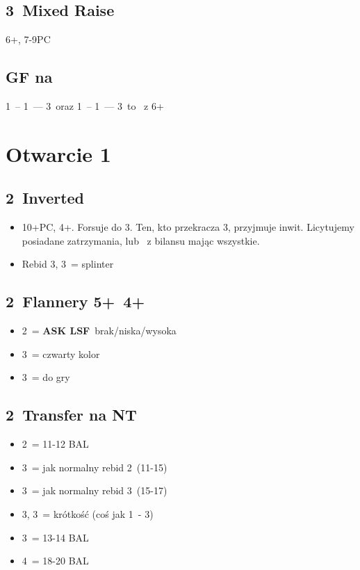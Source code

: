 \documentclass[12pt, a4paper]{article}
\newcommand{\lsf}{\color{WildStrawberry}\textbf{ASK LSF}\color{black}}
\begin{document}
\subsection*{3\clubs\ Mixed Raise}
6+\clubs, 7-9PC

\subsection*{GF na \clubs}
1\clubs\ -- 1\hearts\ --- 3\diams\ oraz 1\clubs\ -- 1\spades\ --- 3\hearts\ to \gf\ z 6+\clubs


\pagebreak
\section{Otwarcie 1\diams}
\subsection{2\diams\ Inverted}
\begin{itemize}
    \item 10+PC, 4+\diams. Forsuje do 3\diams. Ten, kto przekracza 3\diams, przyjmuje inwit.
    Licytujemy posiadane zatrzymania, lub \nt\ z bilansu mając wszystkie.
    \item Rebid 3\hearts, 3\spades\ = splinter
\end{itemize}

\subsection*{2\hearts\ Flannery 5+\spades\ 4+\hearts}
\begin{itemize}
    \item 2\nt\ = \lsf\ brak/niska/wysoka
    \item 3\clubs\ = czwarty kolor \gf
    \item 3\diams\ = do gry
\end{itemize}

\subsection*{2\spades\ Transfer na NT}
\begin{itemize}
    \item 2\nt\ = 11-12 BAL
    \item 3\clubs\ = jak normalny rebid 2\diams\ (11-15)
    \item 3\diams\ = jak normalny rebid 3\diams\ (15-17)
    \item 3\hearts, 3\spades\ = krótkość (coś jak 1\nt\ - 3\hearts)
    \item 3\nt\ = 13-14 BAL
    \item 4\nt\ = 18-20 BAL
\end{itemize}
\end{document}

